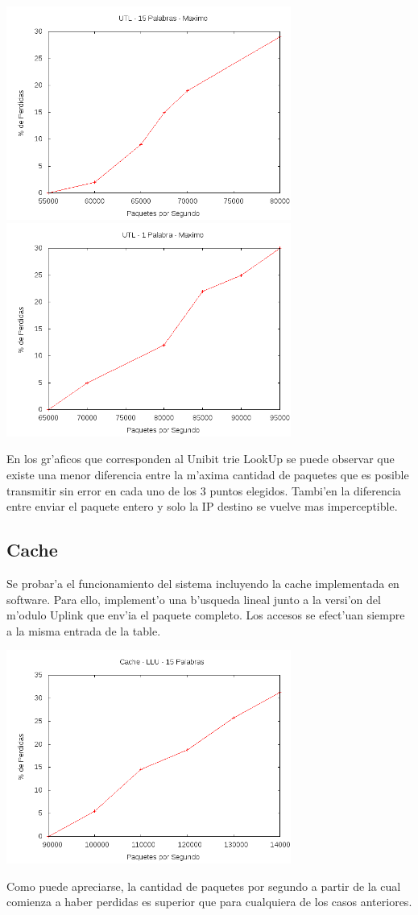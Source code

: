 \documentclass[12pt,spanish]{article}
\begin{document}
\begin{center}
\includegraphics[width=0.7\textwidth]{graf/utl15pmax.png}
\includegraphics[width=0.7\textwidth]{graf/utl1pmax.png}	
\end{center}

En los gr'aficos que corresponden al Unibit trie LookUp se puede observar que existe una menor diferencia entre la m'axima cantidad de paquetes que es posible transmitir sin error en cada uno de los 3 puntos elegidos. Tambi'en la diferencia entre enviar el paquete entero y solo la IP destino se vuelve mas imperceptible.

\subsection{Cache}

Se probar'a el funcionamiento del sistema incluyendo la cache implementada en software. Para ello, implement'o una b'usqueda lineal junto a la versi'on del m'odulo Uplink que env'ia el paquete completo. Los accesos se efect'uan siempre a la misma entrada de la table.

\begin{center}
\includegraphics[width=0.7\textwidth]{graf/cache.png}
\end{center}

Como puede apreciarse, la cantidad de paquetes por segundo a partir de la cual comienza a haber perdidas es superior que para cualquiera de los casos anteriores.
\end{document}

